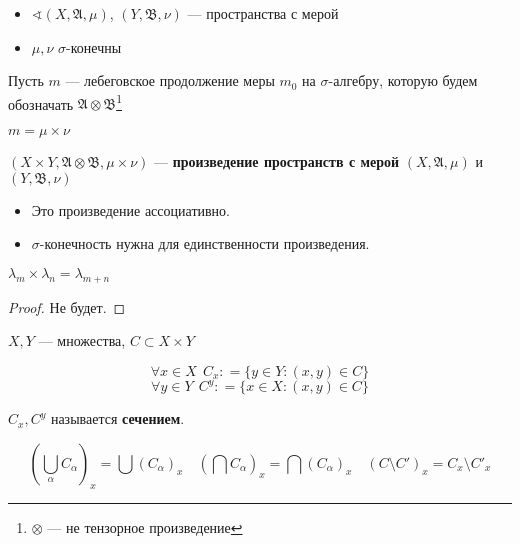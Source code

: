 \begin{definition}\itemfix
    \begin{itemize}
        \item \(\sphericalangle (X, \mathfrak{A}, \mu)\), \((Y, \mathfrak{B}, \nu)\) --- пространства с мерой
        \item \(\mu, \nu\) \(\sigma\)-конечны
    \end{itemize}

    Пусть \(m\) --- лебеговское продолжение меры \(m_0\) на \(\sigma\)-алгебру, которую будем обозначать \(\mathfrak{A} \otimes \mathfrak{B}\)\footnote{\(\otimes\) --- не тензорное произведение}

    \begin{obozn}
        \(m = \mu \times \nu\)
    \end{obozn}

    \((X \times Y, \mathfrak{A} \otimes \mathfrak{B}, \mu \times \nu)\) --- \textbf{произведение пространств с мерой} \((X, \mathfrak{A}, \mu)\) и \((Y, \mathfrak{B}, \nu)\)
\end{definition}

\begin{remark}\itemfix
    \begin{itemize}
        \item Это произведение ассоциативно.
        \item \(\sigma\)-конечность нужна для единственности произведения.
    \end{itemize}
\end{remark}

\begin{theorem}
    \(\lambda_m \times \lambda_n = \lambda_{m + n}\)
\end{theorem}
\begin{proof}
    Не будет.
\end{proof}

\begin{definition}
    \(X, Y\) --- множества, \(C \subset X \times Y\)

    \[\forall x\in X \ \ C_x : = \{y\in Y : (x, y)\in C\}\]
    \[\forall y\in Y \ \ C^y : = \{x\in X : (x, y)\in C\}\]

    \(C_x, C^y\) называется \textbf{сечением}.
\end{definition}

\begin{remark}
    \[\left( \bigcup_\alpha C_\alpha \right)_x = \bigcup (C_\alpha)_x \quad \left( \bigcap C_\alpha \right)_x = \bigcap (C_\alpha)_x \quad (C \setminus C')_x = C_x \setminus C'_x \]
\end{remark}

